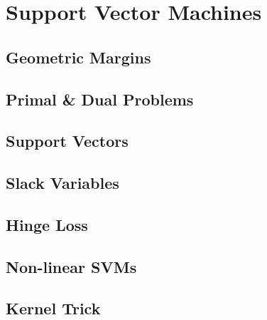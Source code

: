 
\chapter{Support Vector Machines}
\label{chapter6}

\section{Geometric Margins}

\section{Primal \& Dual Problems}

\section{Support Vectors}

\section{Slack Variables}

\section{Hinge Loss}

\section{Non-linear SVMs}

\section{Kernel Trick}